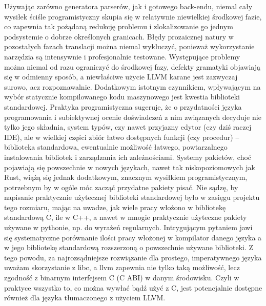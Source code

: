 Używając zarówno generatora parserów, jak i gotowego back-endu, niemal cały wysiłek ściśle programistyczny skupia się w relatywnie niewielkiej środkowej fazie, co zapewnia tak pożądaną redukcję problemu i zlokalizowanie go jednym podsystemie o dobrze określonych granicach. Błędy prozaicznej natury w pozostałych fazach translacji można niemal wykluczyć, ponieważ wykorzystanie narzędzia są intensywnie i profesjonalnie testowane. Występujące problemy można niemal od razu ograniczyć do środkowej fazy, defekty gramatyki objawiają się w odmienny sposób, a niewłaściwe użycie LLVM karane jest zazwyczaj surowo, acz rozpoznawalnie. 
Dodatkowym istotnym czynnikiem, wpływającym na wybór statycznie kompilowanego kodu maszynowego jest kwestia biblioteki standardowej. Praktyka programistyczna sugeruje, że o przydatności języka programowania i subiektywnej ocenie doświadczeń z nim związanych decyduje nie tylko jego składnia, system typów, czy nawet przyjazny edytor (czy dziś raczej IDE), ale w wielkiej części zbiór łatwo dostępnych funkcji (czy procedur) – biblioteka standardowa, ewentualnie możliwość łatwego, powtarzalnego instalowania bibliotek i zarządzania ich zależnościami. Systemy pakietów, choć pojawiają się powszechnie w nowych językach, nawet tak niskopoziomowych jak Rust, wiążą się jednak dodatkowym, znacznym wysiłkiem programistycznym, potrzebnym by w ogóle móc zacząć przydatne pakiety pisać. Nie sądzę, by napisanie praktycznie użytecznej biblioteki standardowej było w zasięgu projektu tego rozmiaru, mając na uwadze, jak wiele pracy włożono w bibliotekę standardową C, ile w C++, a nawet w mnogie praktycznie użyteczne pakiety używane w pythonie, np. do wyrażeń regularnych. Intrygującym pytaniem jawi się systematyczne porównanie ilości pracy włożonej w kompilator danego języka a w jego bibliotekę standardową rozszerzoną o powszechnie używane biblioteki.
Z tego powodu, za najrozsądniejsze rozwiązanie dla prostego, imperatywnego języka uważam skorzystanie z libc, a llvm zapewnia nie tylko taką możliwość, lecz zgodność z binarnym interfejsem C (C ABI) w danym środowisku. Czyli w praktyce wszystko to, co można wywłać bądź użyć z C, jest potencjalnie dostępne również dla języka tłumaczonego z użyciem LLVM.

